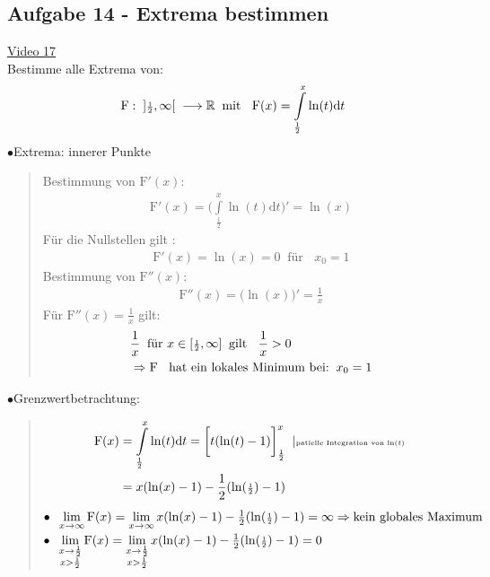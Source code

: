 \subsection{Aufgabe 14 - Extrema bestimmen}
\href{https://youtu.be/9nOEDykwLso}{Video 17}\\
Bestimme alle Extrema von:\\
\begin{align*}
\mathrm{F}:\;\;]\genfrac{}{}{}{2}{1 }{2 },\infty[\;\;\longrightarrow \mathbb{R}\;\;\text{mit }\;\;\mathrm{F}(x)=\int\limits_{\frac{1}{2}}^{x} \ln(t)\mathrm{d}t
\end{align*}
$ \bullet $\;\;Extrema: \glqq innerer Punkte\grqq\\
\begin{quote}
	Bestimmung von $ \mathrm{F}'(x) $:
	\begin{align*}
	\mathrm{F}'(x)=\bigg(\int\limits_{\frac{1}{2}}^{x}\ln(t)\mathrm{d}t\bigg)'=\ln(x)
	\end{align*}
	Für die Nullstellen gilt :\\
	\begin{align*}
	\mathrm{F}'(x)=\ln(x)=0\;\;\text{für  }\;\;x_0=1
	\end{align*}
	Bestimmung von $ \mathrm{F}''(x) $:\\
	\begin{align*}
	\mathrm{F}''(x)=\bigg(\ln(x)\bigg)'=\frac{1}{x}
	\end{align*}
	Für  $ \mathrm{F}''(x)=\frac{1}{x}$ gilt:\\
	\begin{align*}
	&\frac{1}{x}\;\;\text{für }x\in [\genfrac{}{}{}{2}{1 }{2 },\infty]\;\;\text{gilt }\;\;\frac{1}{x}>0\\
	&\Rightarrow \mathrm{F}\;\;\text{ hat ein lokales Minimum bei:}\;\;x_0=1\\
	\end{align*}
\end{quote}
$ \bullet $\;\;Grenzwertbetrachtung:\\
\begin{quote}
	
	\begin{align*}
	\mathrm{F}(x)&=\int\limits_{\frac{1}{2}}^{x} \ln(t)\mathrm{d}t=\bigg[t(\ln(t)-1)\bigg]^x_{\frac{1}{2}}\;\;|\text{\tiny patielle Integration von $ \ln(t) $ }\\
	&=x(\ln(x)-1)-\frac{1}{2}(\ln(\genfrac{}{}{}{2}{1}{2})-1)
	\end{align*}
	$ \bullet \;\;\lim\limits_ {x\to\infty}\mathrm{F}(x)=\lim\limits_ {x\to\infty}x(\ln(x)-1)-\frac{1}{2}(\ln(\genfrac{}{}{}{2}{1 }{2 })-1)=\infty\Rightarrow\text{kein globales Maximum }$\\
	$ \bullet\;\;\lim\limits_ {\substack{x\to \frac{1}{2}\\x>\frac{1}{2}}}\mathrm{F}(x)= \lim\limits_ {\substack{x\to \frac{1}{2}\\x>\frac{1}{2}}}x(\ln(x)-1)-\frac{1}{2}(\ln(\genfrac{}{}{}{2}{1}{2 })-1)=0$
\end{quote}
